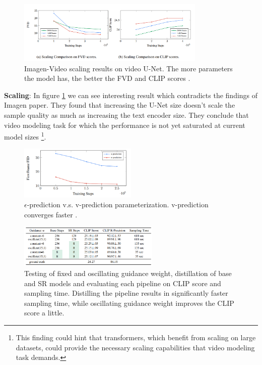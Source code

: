 \begin{figure}
    \centering
    \includegraphics[width=0.8\textwidth]{images/imagen_video/scaling.png}
    \caption{Imagen-Video scaling results on video U-Net. The more parameters the model has, the better the FVD and CLIP scores \cite{imagen_video}.}
    \label{fig:imagen_video_scaling}
\end{figure}

\textbf{Scaling}: In figure \ref{fig:imagen_video_scaling} we can see interesting result which contradicts the findings of Imagen \cite{imagen} paper. They found that increasing the U-Net size doesn't scale the sample quality as much as increasing the text encoder size. They conclude that video modeling task for which the performance is not yet saturated at current model sizes \footnote{This finding could hint that transformers, which benefit from scaling on large datasets, could provide the necessary scaling capabilities that video modeling task demands.}.

\begin{figure}
    \centering
    \includegraphics[width=0.5\textwidth]{images/imagen_video/e_prediction_vs_v_prediction_2.png}
    \caption{$\epsilon$-prediction v.s. v-prediction parameterization. v-prediction converges faster \cite{imagen_video}.}
\end{figure}

\begin{figure}
    \centering
    \includegraphics[width=0.6\textwidth]{images/imagen_video/experiments_table.png}
    \caption{Testing of fixed and oscillating guidance weight, distillation of base and SR models and evaluating each pipeline on CLIP score and sampling time. Distilling the pipeline results in significantly faster sampling time, while oscillating guidance weight improves the CLIP score a little.}
    \label{fig:imagen_video_experiments_table}
\end{figure}

